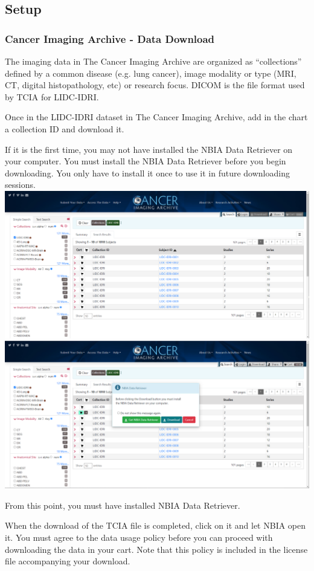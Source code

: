 \documentclass[12pt]{article}
\begin{document}
	\subsection{Setup}\label{sub:install}
	\subsubsection{Cancer Imaging Archive - Data Download}
The imaging data in The Cancer Imaging Archive are organized as “collections” defined by a common disease (e.g. lung cancer), image modality or type (MRI, CT, digital histopathology, etc) or research focus. 
DICOM is the file format used by TCIA for LIDC-IDRI.

Once in the LIDC-IDRI dataset in The Cancer Imaging Archive, add in the chart a collection ID and download it. 

If it is the first time, you may not have installed the NBIA Data Retriever on your computer.
You must install the NBIA Data Retriever before you begin downloading. You only have to install it once to use it in future downloading sessions.
\includegraphics{TCIA1}
\includegraphics{TCIA2}

From this point, you must have installed NBIA Data Retriever.

When the download of the TCIA file is completed, click on it and let NBIA open it.
You must agree to the data usage policy before you can proceed with downloading the data in your cart. Note that this policy is included in the license file accompanying your download.
\end{document}
